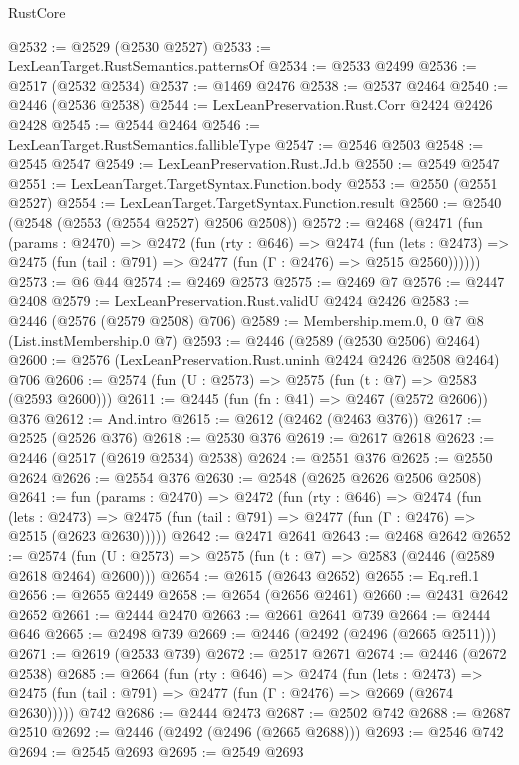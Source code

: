 \begin{lexlean}{RustCore}
\begin{coremodule}
@2532 := @2529 (@2530 @2527)
@2533 := LexLeanTarget.RustSemantics.patternsOf
@2534 := @2533 @2499
@2536 := @2517 (@2532 @2534)
@2537 := @1469 @2476
@2538 := @2537 @2464
@2540 := @2446 (@2536 @2538)
@2544 := LexLeanPreservation.Rust.Corr @2424 @2426 @2428
@2545 := @2544 @2464
@2546 := LexLeanTarget.RustSemantics.fallibleType
@2547 := @2546 @2503
@2548 := @2545 @2547
@2549 := LexLeanPreservation.Rust.Jd.b
@2550 := @2549 @2547
@2551 := LexLeanTarget.TargetSyntax.Function.body
@2553 := @2550 (@2551 @2527)
@2554 := LexLeanTarget.TargetSyntax.Function.result
@2560 := @2540 (@2548 (@2553 (@2554 @2527) @2506 @2508))
@2572 := @2468
    (@2471
      (fun (params : @2470) =>
      @2472
        (fun (rty : @646) =>
        @2474
          (fun (lets : @2473) =>
          @2475 (fun (tail : @791) => @2477 (fun (Γ : @2476) => @2515 @2560))))))
@2573 := @6 @44
@2574 := @2469 @2573
@2575 := @2469 @7
@2576 := @2447 @2408
@2579 := LexLeanPreservation.Rust.validU @2424 @2426
@2583 := @2446 (@2576 (@2579 @2508) @706)
@2589 := Membership.mem.{0, 0} @7 @8 (List.instMembership.{0} @7)
@2593 := @2446 (@2589 (@2530 @2506) @2464)
@2600 := @2576 (LexLeanPreservation.Rust.uninh @2424 @2426 @2508 @2464) @706
@2606 := @2574 (fun (U : @2573) => @2575 (fun (t : @7) => @2583 (@2593 @2600)))
@2611 := @2445 (fun (fn : @41) => @2467 (@2572 @2606)) @376
@2612 := And.intro
@2615 := @2612 (@2462 (@2463 @376))
@2617 := @2525 (@2526 @376)
@2618 := @2530 @376
@2619 := @2617 @2618
@2623 := @2446 (@2517 (@2619 @2534) @2538)
@2624 := @2551 @376
@2625 := @2550 @2624
@2626 := @2554 @376
@2630 := @2548 (@2625 @2626 @2506 @2508)
@2641 := fun (params : @2470) =>
  @2472
    (fun (rty : @646) =>
    @2474
      (fun (lets : @2473) =>
      @2475 (fun (tail : @791) => @2477 (fun (Γ : @2476) => @2515 (@2623 @2630)))))
@2642 := @2471 @2641
@2643 := @2468 @2642
@2652 := @2574 (fun (U : @2573) => @2575 (fun (t : @7) => @2583 (@2446 (@2589 @2618 @2464) @2600)))
@2654 := @2615 (@2643 @2652)
@2655 := Eq.refl.{1}
@2656 := @2655 @2449
@2658 := @2654 (@2656 @2461)
@2660 := @2431 @2642 @2652
@2661 := @2444 @2470
@2663 := @2661 @2641 @739
@2664 := @2444 @646
@2665 := @2498 @739
@2669 := @2446 (@2492 (@2496 (@2665 @2511)))
@2671 := @2619 (@2533 @739)
@2672 := @2517 @2671
@2674 := @2446 (@2672 @2538)
@2685 := @2664
    (fun (rty : @646) =>
    @2474
      (fun (lets : @2473) =>
      @2475 (fun (tail : @791) => @2477 (fun (Γ : @2476) => @2669 (@2674 @2630)))))
    @742
@2686 := @2444 @2473
@2687 := @2502 @742
@2688 := @2687 @2510
@2692 := @2446 (@2492 (@2496 (@2665 @2688)))
@2693 := @2546 @742
@2694 := @2545 @2693
@2695 := @2549 @2693

\end{coremodule}
\end{lexlean}
